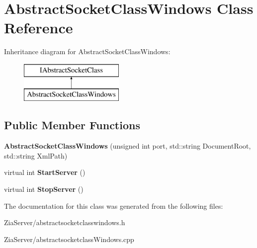 \hypertarget{class_abstract_socket_class_windows}{
\section{AbstractSocketClassWindows Class Reference}
\label{class_abstract_socket_class_windows}
}
Inheritance diagram for AbstractSocketClassWindows:\begin{figure}[H]
\begin{center}
\leavevmode
\includegraphics[height=2.000000cm]{class_abstract_socket_class_windows}
\end{center}
\end{figure}
\subsection*{Public Member Functions}
\begin{DoxyCompactItemize}
\item 
\hypertarget{class_abstract_socket_class_windows_ad4f8b40d469b68dc710d0cf007803ec0}{
{\bfseries AbstractSocketClassWindows} (unsigned int port, std::string DocumentRoot, std::string XmlPath)}
\label{class_abstract_socket_class_windows_ad4f8b40d469b68dc710d0cf007803ec0}

\item 
\hypertarget{class_abstract_socket_class_windows_a59e30f87c91be4536adb4f51f08086c6}{
virtual int {\bfseries StartServer} ()}
\label{class_abstract_socket_class_windows_a59e30f87c91be4536adb4f51f08086c6}

\item 
\hypertarget{class_abstract_socket_class_windows_afafe9b05475ecf89dad99d8565b324fa}{
virtual int {\bfseries StopServer} ()}
\label{class_abstract_socket_class_windows_afafe9b05475ecf89dad99d8565b324fa}

\end{DoxyCompactItemize}


The documentation for this class was generated from the following files:\begin{DoxyCompactItemize}
\item 
ZiaServer/abstractsocketclasswindows.h\item 
ZiaServer/abstractsocketclassWindows.cpp\end{DoxyCompactItemize}
